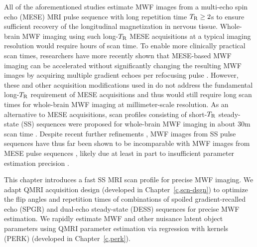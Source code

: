 All of the aforementioned studies
estimate MWF images
from a multi-echo spin echo (MESE) MRI pulse sequence
\cite{carr:54:eod}
with long repetition time $T_\mathrm{R}\geq2$s
to ensure sufficient recovery
of the longitudinal magnetization 
in nervous tissue.
Whole-brain MWF imaging 
using such long-$T_\mathrm{R}$ MESE acquisitions
at a typical imaging resolution
would require hours of scan time.
To enable more clinically practical scan times,
researchers have more recently shown
that MESE-based MWF imaging
can be accelerated
without significantly changing
the resulting MWF images \cite{does:00:rat,prasloski:12:rwc}
by acquiring multiple gradient echoes
per refocusing pulse \cite{feinberg:91:gga}.
However, 
these and other acquisition modifications
used in \cite{prasloski:12:rwc}
do not address the fundamental long-$T_\mathrm{R}$ requirement
of MESE acquisitions
and thus would still require long scan times
for whole-brain MWF imaging
at millimeter-scale resolution.
As an alternative to MESE acquisitions,
scan profiles consisting of short-$T_\mathrm{R}$ steady-state (SS) sequences
were proposed 
for whole-brain MWF imaging in about 30m scan time
\cite{deoni:08:gmt}.
Despite recent further refinements
\cite{deoni:11:com, deoni:13:oct},
MWF images from SS pulse sequences 
have thus far been shown
to be incomparable with MWF images
from MESE pulse sequences
\cite{zhang:15:com},
likely due at least in part
to insufficient parameter estimation precision
\cite{lankford:13:oti}.

This chapter introduces
a fast SS MRI scan profile
for precise MWF imaging.
We adapt QMRI acquisition design
(developed in Chapter~\ref{c,scn-dsgn})
to optimize the flip angles and repetition times
of combinations 
of spoiled gradient-recalled echo (SPGR)
\cite{zur:91:sot}
and dual-echo steady-state (DESS) 
\cite{redpath:88:fan, bruder:88:ans} sequences
for precise MWF estimation.
We rapidly estimate MWF and 
other nuisance latent object parameters
using QMRI parameter estimation
via regression with kernels (PERK)
(developed in Chapter~\ref{c,perk}).

